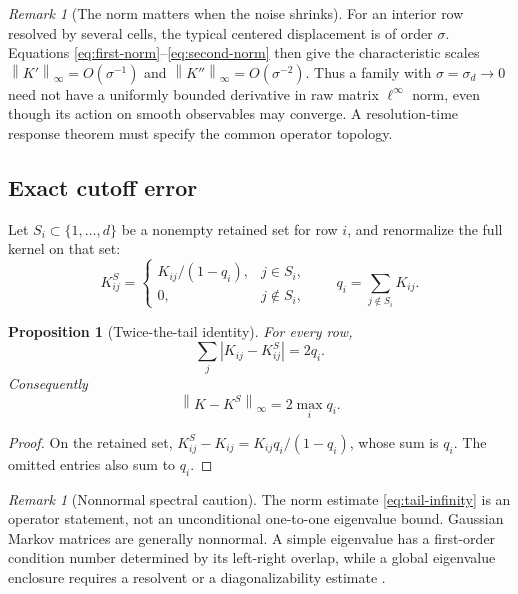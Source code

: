 \documentclass[11pt]{article}
\newtheorem{proposition}[theorem]{Proposition}
\theoremstyle{definition}
\theoremstyle{remark}
\newtheorem{remark}[theorem]{Remark}
\newcommand{\norm}[1]{\left\lVert #1\right\rVert}
\begin{document}
\begin{remark}[The norm matters when the noise shrinks]\label{rem:norm}
For an interior row resolved by several cells, the typical centered
displacement is of order $\sigma$.  Equations
\eqref{eq:first-norm}--\eqref{eq:second-norm} then give the characteristic
scales $\norm{K'}_\infty=O(\sigma^{-1})$ and
$\norm{K''}_\infty=O(\sigma^{-2})$.  Thus a family with
$\sigma=\sigma_d\to0$ need not have a uniformly bounded derivative in raw
matrix $\ell^\infty$ norm, even though its action on smooth observables may
converge.  A resolution-time response theorem must specify the common
operator topology.
\end{remark}

\subsection{Exact cutoff error}

Let $S_i\subset\{1,\ldots,d\}$ be a nonempty retained set for row $i$, and
renormalize the full kernel on that set:
\begin{equation}\label{eq:truncated-kernel}
  K^S_{ij}=
  \begin{cases}
    K_{ij}/(1-q_i),&j\in S_i,\\
    0,&j\notin S_i,
  \end{cases}
  \qquad
  q_i=\sum_{j\notin S_i}K_{ij}.
\end{equation}

\begin{proposition}[Twice-the-tail identity]\label{prop:tail}
For every row,
\begin{equation}\label{eq:tail-identity}
  \sum_j|K_{ij}-K^S_{ij}|=2q_i.
\end{equation}
Consequently
\begin{equation}\label{eq:tail-infinity}
  \norm{K-K^S}_\infty=2\max_iq_i.
\end{equation}
\end{proposition}

\begin{proof}
On the retained set, $K^S_{ij}-K_{ij}=K_{ij}q_i/(1-q_i)$,
whose sum is $q_i$.  The omitted entries also sum to $q_i$.
\end{proof}

\begin{remark}[Nonnormal spectral caution]\label{rem:nonnormal}
The norm estimate \eqref{eq:tail-infinity} is an operator statement, not an
unconditional one-to-one eigenvalue bound.  Gaussian Markov matrices are
generally nonnormal.  A simple eigenvalue has a first-order condition number
determined by its left-right overlap, while a global eigenvalue enclosure
requires a resolvent or a diagonalizability estimate
\citep{Kato1995,StewartSun1990}.
\end{remark}
\end{document}
